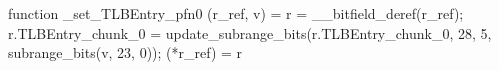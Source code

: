 function _set_TLBEntry_pfn0 (r_ref, v) = {
    r = __bitfield_deref(r_ref);
    r.TLBEntry_chunk_0 = update_subrange_bits(r.TLBEntry_chunk_0, 28, 5, subrange_bits(v, 23, 0));
    (*r_ref) = r
}
